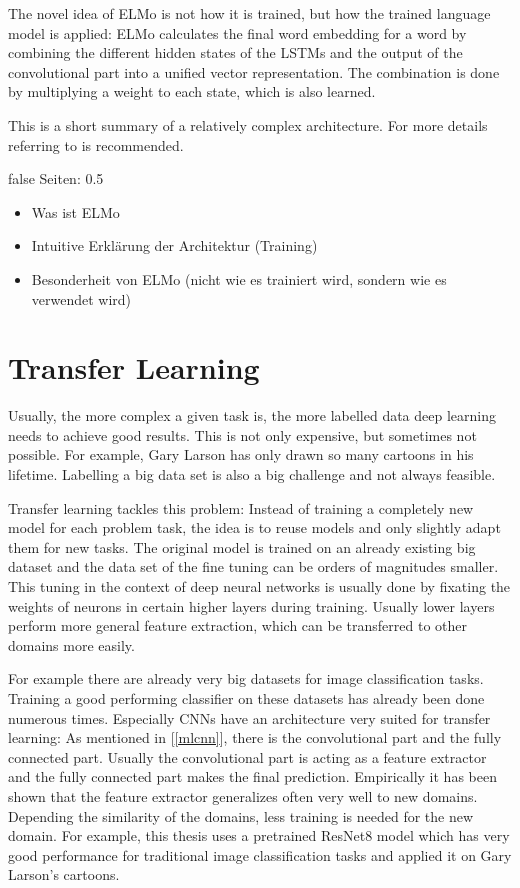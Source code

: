 \documentclass[draft,final,oneside]{vutinfth} %
\begin{document}
The novel idea of ELMo is not how it is trained, but how the trained language model is applied: ELMo calculates the final word embedding for a word by combining the different hidden states of the LSTMs and the output of the convolutional part into a unified vector representation. The combination is done by multiplying a weight to each state, which is also learned.

This is a short summary of a relatively complex architecture. For more details referring to \cite{elmo} is recommended.

\if false
Seiten: 0.5

\begin{itemize}
\item Was ist ELMo
\item Intuitive Erklärung der Architektur (Training)
\item Besonderheit von ELMo (nicht wie es trainiert wird, sondern wie es verwendet wird)
\end{itemize}

\fi


\section{Transfer Learning} \label{transferlearning}

Usually, the more complex a given task is, the more labelled data deep learning needs to achieve good results. This is not only expensive, but sometimes not possible. For example, Gary Larson has only drawn so many cartoons in his lifetime. Labelling a big data set is also a big challenge and not always feasible.

Transfer learning tackles this problem: Instead of training a completely new model for each problem task, the idea is to reuse models and only slightly adapt them for new tasks. The original model is trained on an already existing big dataset and the data set of the fine tuning can be orders of magnitudes smaller. This tuning in the context of deep neural networks is usually done by fixating the weights of neurons in certain higher layers during training. Usually lower layers perform more general feature extraction, which can be transferred to other domains more easily.

For example there are already very big datasets for image classification tasks. Training a good performing classifier on these datasets has already been done numerous times. Especially CNNs have an architecture very suited for transfer learning: As mentioned in [\ref{mlcnn}], there is the convolutional part and the fully connected part. Usually the convolutional part is acting as a feature extractor and the fully connected part makes the final prediction. Empirically it has been shown that the feature extractor generalizes often very well to new domains. Depending the similarity of the domains, less training is needed for the new domain. For example, this thesis uses a pretrained ResNet8 model which has very good performance for traditional image classification tasks and applied it on Gary Larson's cartoons.
\end{document}
